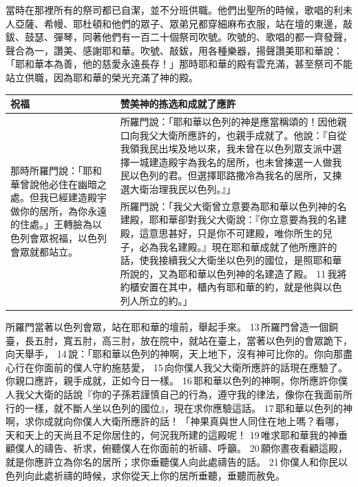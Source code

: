 當時在那裡所有的祭司都已自潔，並不分班供職。他們出聖所的時候，歌唱的利未人亞薩、希幔、耶杜頓和他們的眾子、眾弟兄都穿細麻布衣服，站在壇的東邊，敲鈸、鼓瑟、彈琴，同著他們有一百二十個祭司吹號。吹號的、歌唱的都一齊發聲，聲合為一，讚美、感謝耶和華。吹號、敲鈸，用各種樂器，揚聲讚美耶和華說：「耶和華本為善，他的慈愛永遠長存！」那時耶和華的殿有雲充滿，甚至祭司不能站立供職，因為耶和華的榮光充滿了神的殿。







\begin{table}[H]

\centering
\begin{tabular}{p{3cm}|p{}}\hline\hline
祝福&赞美神的拣选和成就了應許　\\\hline\hline
\multirow{2}{3.1cm}{那時所羅門說：「耶和華曾說他必住在幽暗之處。但我已經建造殿宇做你的居所，為你永遠的住處。」王轉臉為以色列會眾祝福，以色列會眾就都站立。}&所羅門說：「耶和華以色列的神是應當稱頌的！因他親口向我父大衛所應許的，也親手成就了。他說：『自從我領我民出埃及地以來，我未曾在以色列眾支派中選擇一城建造殿宇為我名的居所，也未曾揀選一人做我民以色列的君。但選擇耶路撒冷為我名的居所，又揀選大衛治理我民以色列。』」\\\cline{2-2}
&所羅門說：「我父大衛曾立意要為耶和華以色列神的名建殿，耶和華卻對我父大衛說：『你立意要為我的名建殿，這意思甚好，只是你不可建殿，唯你所生的兒子，必為我名建殿。』現在耶和華成就了他所應許的話，使我接續我父大衛坐以色列的國位，是照耶和華所說的，又為耶和華以色列神的名建造了殿。 11 我將約櫃安置在其中，櫃內有耶和華的約，就是他與以色列人所立的約。」\\\hline
\end{tabular}
\end{table}

所羅門當著以色列會眾，站在耶和華的壇前，舉起手來。 13 所羅門曾造一個銅臺，長五肘，寬五肘，高三肘，放在院中，就站在臺上，當著以色列的會眾跪下，向天舉手， 14 說：「耶和華以色列的神啊，天上地下，沒有神可比你的。你向那盡心行在你面前的僕人守約施慈愛， 15 向你僕人我父大衛所應許的話現在應驗了。你親口應許，親手成就，正如今日一樣。 16 耶和華以色列的神啊，你所應許你僕人我父大衛的話說『你的子孫若謹慎自己的行為，遵守我的律法，像你在我面前所行的一樣，就不斷人坐以色列的國位』，現在求你應驗這話。 17 耶和華以色列的神啊，求你成就向你僕人大衛所應許的話！ 「神果真與世人同住在地上嗎？看哪，天和天上的天尚且不足你居住的，何況我所建的這殿呢！ 19 唯求耶和華我的神垂顧僕人的禱告、祈求，俯聽僕人在你面前的祈禱、呼籲。 20 願你晝夜看顧這殿，就是你應許立為你名的居所；求你垂聽僕人向此處禱告的話。 21 你僕人和你民以色列向此處祈禱的時候，求你從天上你的居所垂聽，垂聽而赦免。


